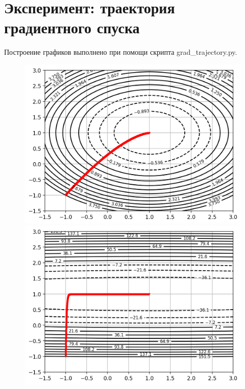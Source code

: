 \documentclass[notitlepage]{article}
\begin{document}
\section*{Эксперимент: траектория градиентного спуска}
Построение графиков выполнено при помощи скрипта grad\_trajectory.py. 
\begin{figure}[ht]
\begin{minipage}[t]{.5\textwidth}
  \centering
  \includegraphics[width=\textwidth, keepaspectratio]{plots/trajectory_0_0.png}
\end{minipage}
\begin{minipage}[t]{.5\textwidth}
  \centering
  \includegraphics[width=\textwidth, keepaspectratio]{plots/trajectory_1_0.png}
\end{minipage}
\end{figure}
\end{document}
